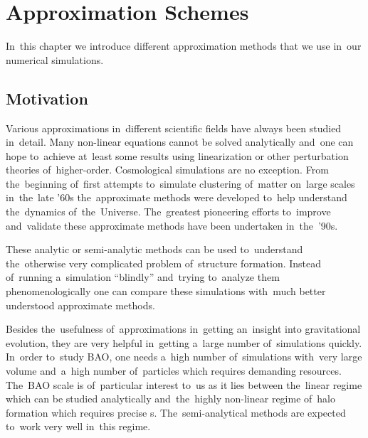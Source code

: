 \chapter{Approximation Schemes}
\label{chpt:app_schemes}
In~this chapter we introduce different approximation methods that we use in~our numerical simulations.%

\section{Motivation}
Various approximations in~different scientific fields have always been studied in~detail. Many non-linear equations cannot be solved analytically and~one can hope to~achieve at~least some results using linearization or other perturbation theories of~higher-order. Cosmological simulations are no exception. From the~beginning of~first attempts to~simulate clustering of~matter on~large scales in~the~late '60s the~approximate methods were developed to~help understand the~dynamics of~the~Universe. The~greatest pioneering efforts to~improve and~validate these approximate methods have been undertaken in~the~'90s.

These analytic or semi-analytic methods can be used to~understand the~otherwise very complicated problem of~structure formation. Instead of~running a~simulation ``blindly'' and~trying to~analyze them phenomenologically one can compare these simulations with~much better understood approximate methods.

Besides the~usefulness of~approximations in~getting an~insight into gravitational evolution, they are very helpful in~getting a~large number of~simulations quickly. In~order to~study BAO, one needs a~high number of~simulations with~very large volume and~a~high number of~particles which requires demanding resources. The~BAO scale is of~particular interest to~us as it lies between the~linear regime which can be studied analytically and~the~highly non-linear regime of~halo formation which requires precise \nbodysim s. The~semi-analytical methods are expected to~work very well in~this regime.

